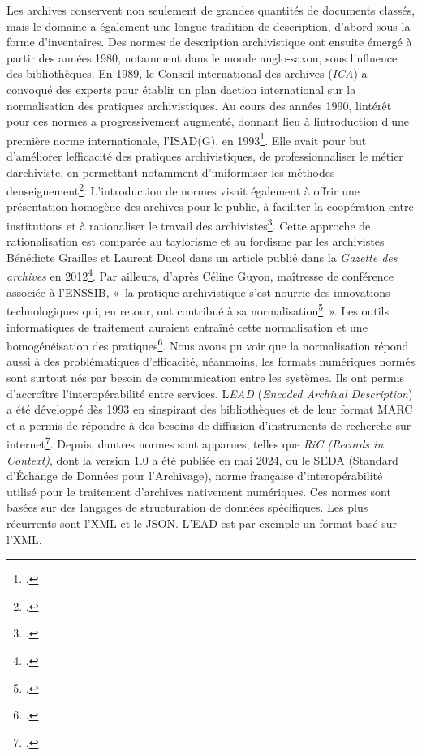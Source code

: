 	Les archives conservent non seulement de grandes quantités de documents classés, mais le domaine a également une longue tradition de description, d'abord sous la forme d'inventaires.
	Des normes de description archivistique ont ensuite émergé à partir des années 1980, notamment dans le monde
	anglo-saxon, sous l\textquotesingle influence des bibliothèques. En
	1989, le Conseil international des archives (\emph{ICA}) a convoqué des experts pour établir un plan
	d\textquotesingle action international sur la normalisation des
	pratiques archivistiques. Au cours des années 1990,
	l\textquotesingle intérêt pour ces normes a progressivement augmenté,
	donnant lieu à l\textquotesingle introduction d'une première norme
	internationale, l'ISAD(G), en 1993\footcite{nougaret_vers_1995}. Elle avait pour but d'améliorer
	l\textquotesingle efficacité des pratiques archivistiques, de
	professionnaliser le métier d\textquotesingle archiviste, en permettant
	notamment d'uniformiser les méthodes
	d\textquotesingle enseignement\footcite{motte_normalisation_2015}.
	L'introduction de normes visait également à offrir une présentation homogène des archives
	pour le public, à faciliter la coopération entre institutions et à
	rationaliser le travail des archivistes\footcite{motte_normalisation_2015}. Cette approche
	de rationalisation est comparée au taylorisme et au fordisme par les
	archivistes Bénédicte Grailles et Laurent Ducol dans un article publié
	dans la \emph{Gazette des archives} en 2012\footcite{grailles_enjeux_2012}.
	Par ailleurs, d'après Céline Guyon, maîtresse de conférence associée à
	l'ENSSIB, «~la pratique archivistique s'est nourrie des innovations
	technologiques qui, en retour, ont contribué à sa
	normalisation\footcite{guyon_archivistique_2022}~». Les outils informatiques de traitement auraient
	entraîné cette normalisation et une homogénéisation des
	pratiques\footcite{guyon_archivistique_2022}. Nous avons pu voir que la normalisation répond aussi à
	des problématiques d'efficacité, néanmoins, les formats numériques
	normés sont surtout nés par besoin de communication entre les systèmes. Ils ont
	permis d'accroître l'interopérabilité entre services.
	L\textquotesingle \emph{EAD} (\emph{Encoded Archival Description}) a
	été développé dès 1993 en s\textquotesingle inspirant des bibliothèques
	et de leur format MARC et a permis de répondre à des besoins de
	diffusion d'instruments de recherche sur internet\footcite{dooley_encoded_1997}.
	Depuis, d\textquotesingle autres normes sont apparues, telles que
	\emph{RiC (Records in Context)}, dont la version 1.0 a été publiée en mai 2024, ou le
	SEDA (Standard d'Échange de Données pour l'Archivage), norme
	française d'interopérabilité utilisé pour le traitement d'archives
	nativement numériques. Ces normes sont basées sur des langages de
	structuration de données spécifiques. Les plus
	récurrents sont l'XML et le JSON.
	L'EAD est par exemple un format basé sur l'XML. 
	
